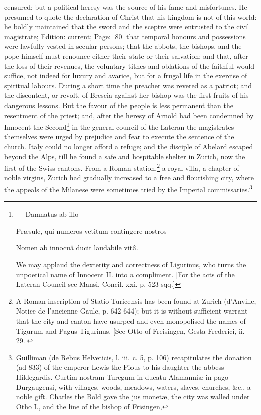 censured; but a political heresy was the source of his fame and misfortunes. He presumed to quote the declaration of Christ that his kingdom is not of this world: he boldly maintained that the sword and the sceptre were entrusted to the civil magistrate; Edition: current; Page: [80] that temporal honours and possessions were lawfully vested in secular persons; that the abbots, the bishops, and the pope himself must renounce either their state or their salvation; and that, after the loss of their revenues, the voluntary tithes and oblations of the faithful would suffice, not indeed for luxury and avarice, but for a frugal life in the exercise of spiritual labours. During a short time the preacher was revered as a patriot; and the discontent, or revolt, of Brescia against her bishop was the first-fruits of his dangerous lessons. But the favour of the people is less permanent than the resentment of the priest; and, after the heresy of Arnold had been condemned by Innocent the Second\footnote{\texthebrew{—} Damnatus ab illo

Præsule, qui numeros vetitum contingere nostros

Nomen ab innocuâ ducit laudabile vitâ.

We may applaud the dexterity and correctness of Ligurinus, who turns the unpoetical name of Innocent II. into a compliment. [For the acts of the Lateran Council see Mansi, Concil. xxi. p. 523 sqq.]} in the general council of the Lateran the magistrates themselves were urged by prejudice and fear to execute the sentence of the church. Italy could no longer afford a refuge; and the disciple of Abelard escaped beyond the Alps, till he found a safe and hospitable shelter in Zurich, now the first of the Swiss cantons. From a Roman station,\footnote{A Roman inscription of Statio Turicensis has been found at Zurich (d\texthebrew{}’Anville, Notice de l\texthebrew{}’ancienne Gaule, p. 642-644); but it is without sufficient warrant that the city and canton have usurped and even monopolised the names of Tigurum and Pagus Tigurinus. [See Otto of Freisingen, Gesta Frederici, ii. 29.]} a royal villa, a chapter of noble virgins, Zurich had gradually increased to a free and flourishing city, where the appeals of the Milanese were sometimes tried by the Imperial commissaries.\footnote{Guilliman (de Rebus Helveticis, l. iii. c. 5, p. 106) recapitulates the donation (ad 833) of the emperor Lewis the Pious to his daughter the abbess Hildegardis. Curtim nostram Turegum in ducatu Alamanniæ in pago Durgaugensi, with villages, woods, meadows, waters, slaves, churches, \&c., a noble gift. Charles the Bold gave the jus monetæ, the city was walled under Otho I., and the line of the bishop of Frisingen,

}
